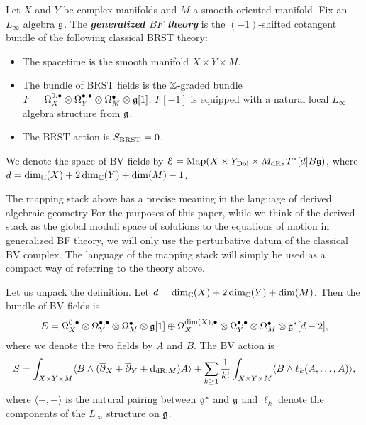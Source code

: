 \documentclass[10pt, oneside]{article}
\newcommand{\defterm}[1]{\textbf{\emph{#1}}}
\begin{document}
\begin{definition}
Let $X$ and $Y$ be complex manifolds and $M$ a smooth oriented manifold. Fix an $L_\infty$ algebra $\mathfrak g$. The \defterm{generalized $BF$ theory} is the $(-1)$-shifted cotangent bundle of the following classical BRST theory:
\begin{itemize}
\item The spacetime is the smooth manifold $X\times Y\times M$.

\item The bundle of BRST fields is the $\mathbb Z$-graded bundle $F = \Omega^{0,\bullet}_X \otimes \Omega^{\bullet,\bullet}_Y \otimes \Omega^\bullet_M \otimes \mathfrak g[1]$. $F[-1]$ is equipped with a natural local $L_\infty$ algebra structure from $\mathfrak g$.

\item The BRST action is $S_{\mathrm{BRST}} = 0$.
\end{itemize}
We denote the space of BV fields by $\mathcal E = \operatorname{Map}(X\times Y_{\mathrm{Dol}}\times M_{\mathrm{dR}}, T^*[d] B\mathfrak g)$, where $d = \dim_\mathbb C(X) + 2\dim_\mathbb C(Y) + \dim(M) - 1$.
\label{def:generalizedBF}
\end{definition}

\begin{remark} \label{mapping_stack_remark}
The mapping stack above has a precise meaning in the language of derived algebraic geometry   For the purposes of this paper, while we think of the derived stack as the global moduli space of solutions to the equations of motion in generalized BF theory, we will only use the perturbative datum of the classical BV complex.  The language of the mapping stack will simply be used as a compact way of referring to the theory above. 
\end{remark}

Let us unpack the definition. Let $d = \dim_\mathbb C(X) + 2\dim_\mathbb C(Y) + \dim(M)$. Then the bundle of BV fields is
\[E = \Omega^{0,\bullet}_X \otimes \Omega^{\bullet,\bullet}_Y \otimes \Omega^\bullet_M \otimes \mathfrak g[1]\oplus \Omega^{\dim(X),\bullet}_X \otimes \Omega^{\bullet,\bullet}_Y \otimes \Omega^\bullet_M\otimes \mathfrak g^*[d-2],\]
where we denote the two fields by $A$ and $B$. The BV action is
\[S = \int_{X\times Y\times M} \langle B\wedge (\overline{\partial}_X + \overline{\partial}_Y + {\rm d}_{\mathrm{dR}, M}) A\rangle + \sum_{k\geq 1}\frac{1}{k!} \int_{X\times Y\times M} \langle B\wedge \ell_k(A, \dots, A)\rangle,\]
where $\langle -, -\rangle$ is the natural pairing between $\mathfrak g^*$ and $\mathfrak g$ and $\ell_k$ denote the components of the $L_\infty$ structure on $\mathfrak g$.
\end{document}
